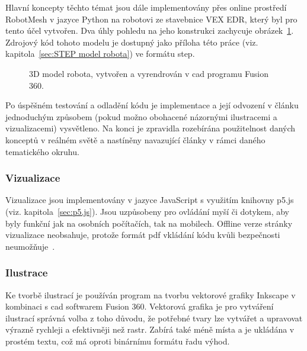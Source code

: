 \documentclass[a4paper, 12pt]{article}
\begin{document}
  Hlavní koncepty těchto témat jsou dále implementovány přes online prostředí RobotMesh v jazyce Python na robotovi ze stavebnice VEX EDR, který byl pro tento účel vytvořen. Dva úhly pohledu na jeho konstrukci zachycuje obrázek~\ref{img:3D model robota}. Zdrojový kód tohoto modelu je dostupný jako příloha této práce (viz. kapitola~\ref{sec:STEP model robota}) ve formátu \gls{step}.

  \begin{figure}[H]%
    \centering

    \hfill

    \caption[3D model robota]{3D model robota, vytvořen a vyrendrován v \gls{cad} programu Fusion 360.}%
    \label{img:3D model robota}%
  \end{figure}

  Po úspěšném testování a odladění kódu je implementace a její odvození v článku jednoduchým způsobem (pokud možno obohacené názornými ilustracemi a vizualizacemi) vysvětleno. Na konci je zpravidla rozebírána použitelnost daných konceptů v reálném světě a nastíněny navazující články v rámci daného tematického okruhu.


  \subsubsection{Vizualizace} \label{sec:Vizualizace}
  Vizualizace jsou implementovány v jazyce JavaScript s využitím knihovny p5.js (viz. kapitola~\ref{sec:p5.js}). Jsou uzpůsobeny pro ovládání myší či dotykem, aby byly funkční jak na osobních počítačích, tak na mobilech. Offline verze stránky vizualizace neobsahuje, protože formát \gls{pdf} vkládání kódu kvůli bezpečnosti neumožňuje~\cite{history-of-pdf}.


  \subsubsection{Ilustrace} \label{sec:Ilustrace}
  Ke tvorbě ilustrací je používán program na tvorbu vektorové grafiky Inkscape v kombinaci s \gls{cad} softwarem Fusion 360. Vektorová grafika je pro vytváření ilustrací správná volba z toho důvodu, že potřebné tvary lze vytvářet a upravovat výrazně rychleji a efektivněji než rastr. Zabírá také méně místa a je ukládána v prostém textu, což má oproti binárnímu formátu řadu výhod.
\end{document}
